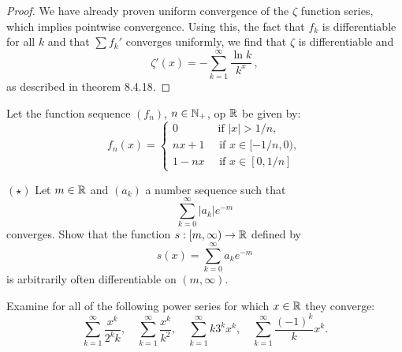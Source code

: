 \documentclass[week=12]{homework}
\begin{document}
\begin{questions}
\begin{proof}
			We have already proven uniform convergence of the $\zeta$ function series, which implies pointwise convergence. Using this, the fact that $f_k$ is differentiable for all $k$ and that $\sum f_k'$ converges uniformly, we find that $\zeta$ is differentiable and
			\[
			\zeta'(x) = - \sum_{k=1}^{\infty} \frac{\ln k}{k^x}\,,
			\]
			as described in theorem 8.4.18.
		\end{proof}
		
		\question
		Let the function sequence $(f_n)$, $n \in \mathbb{N}_+$, op $\mathbb{R}$ be given by:
		\[
			f_n(x) = \begin{cases}
				0 		\qquad \quad \; \text{ if } |x| > 1/n, \\
				nx+1 	\quad \text{ if } x \in [-1/n,0), \\
				1 - nx 	\quad \text{ if } x \in [0,1/n]
			\end{cases}
		\]
		
		\question
		$(\star)$ Let $m \in \mathbb{R}$ and $(a_k)$ a number sequence such that 
		\[
			\sum_{k=0}^{\infty} |a_k|e^{-m}
		\]
		converges. Show that the function $s : [m,\infty) \to \mathbb{R}$ defined by 
		\[
			s(x) = \sum_{k=0}^{\infty} a_k e^{-m}
		\] 
		is arbitrarily often differentiable on $(m,\infty)$. 

	     \question
	     Examine for all of the following power series for which $x \in \mathbb{R}$ they converge:
	     \[
	     \sum_{k=1}^{\infty} \frac{x^k}{2^k k}, \quad 
	     \sum_{k=1}^{\infty} \frac{x^k}{k^2}, \quad
	     \sum_{k=1}^{\infty} k 3^k x^k, \quad 
	     \sum_{k=1}^{\infty} \frac{(-1)^k}{k} x^k.
	     \]
     \end{questions}
\end{document}
